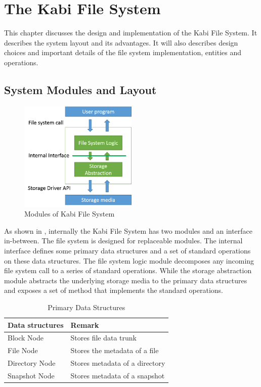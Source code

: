 \chapter{The Kabi File System}
\label{chap:fs}

    This chapter discusses the design and implementation of the Kabi File System. It describes the system layout and its advantages. It will also describes design choices and important details of the file system implementation, entities and operations.

\section{System Modules and Layout}

\begin{figure}[t]
\centering
\includegraphics[width=0.5\textwidth]{Chapter-3/figs/fig8.png}
\caption{Modules of Kabi File System}
\label{fig:modules}
\end{figure}

    As shown in , internally the Kabi File System has two modules and an interface in-between. The file system is designed for replaceable modules. The internal interface defines some primary data structures and a set of standard operations on these data structures. The file system logic module decomposes any incoming file system call to a series of standard operations.
	While the storage abstraction module abstracts the underlying storage media to the primary data structures and exposes a set of method that implements the standard operations.

\begin{table}[t]
\begin{center}
\caption{Primary Data Structures}
\begin{tabular}{ll}
\toprule
Data structures & Remark\\
\midrule
Block Node & Stores file data trunk\\
File Node & Stores the metadata of a file\\
Directory Node & Stores metadata of a directory \\
Snapshot Node & Stores metadata of a snapshot\\
\bottomrule
\end{tabular}
\end{center}
\label{tab:data_struct}
\end{table}

